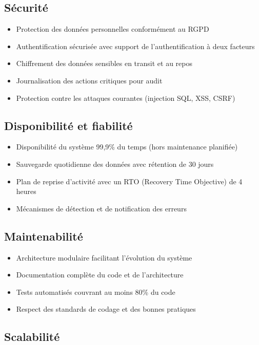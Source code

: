 \documentclass[12pt,a4paper]{report}
\begin{document}
\subsection{Sécurité}

\begin{itemize}
\item Protection des données personnelles conformément au RGPD
\item Authentification sécurisée avec support de l'authentification à deux facteurs
\item Chiffrement des données sensibles en transit et au repos
\item Journalisation des actions critiques pour audit
\item Protection contre les attaques courantes (injection SQL, XSS, CSRF)
\end{itemize}

\subsection{Disponibilité et fiabilité}

\begin{itemize}
\item Disponibilité du système 99,9\% du temps (hors maintenance planifiée)
\item Sauvegarde quotidienne des données avec rétention de 30 jours
\item Plan de reprise d'activité avec un RTO (Recovery Time Objective) de 4 heures
\item Mécanismes de détection et de notification des erreurs
\end{itemize}

\subsection{Maintenabilité}

\begin{itemize}
\item Architecture modulaire facilitant l'évolution du système
\item Documentation complète du code et de l'architecture
\item Tests automatisés couvrant au moins 80\% du code
\item Respect des standards de codage et des bonnes pratiques
\end{itemize}

\subsection{Scalabilité}
\end{document}
